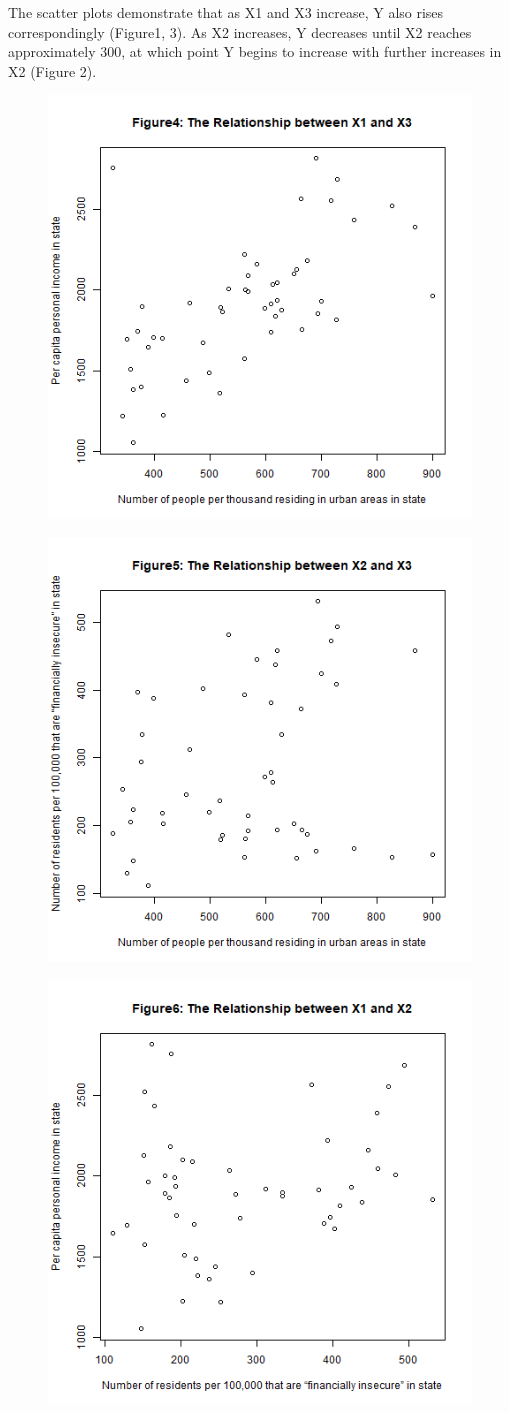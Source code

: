 \documentclass[12pt,letterpaper]{article}
\begin{document}
\begin{itemize}
\begin{figure}[H]
\end{figure}
\noindent The scatter plots demonstrate that as X1 and X3 increase, Y also rises correspondingly (Figure1, 3). As X2 increases, Y decreases until X2 reaches approximately 300, at which point Y begins to increase with further increases in X2 (Figure 2). \\

  
\begin{figure}[H]
	\centering
	\includegraphics[width=.6\textwidth]{X1~X3.png}
\end{figure}
\begin{figure}[H]
	\centering
	\includegraphics[width=.6\textwidth]{X2~X3.png}
\end{figure}
\begin{figure}[H]
	\centering
	\includegraphics[width=.6\textwidth]{X1~X2.png}
\end{figure}



\end{itemize}
\end{document}
